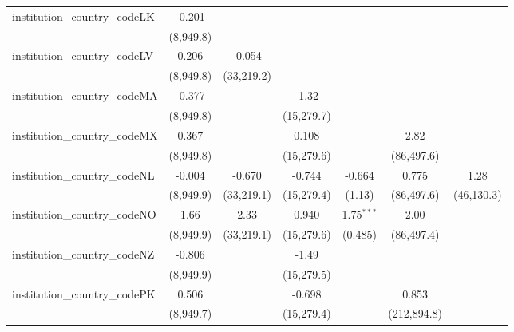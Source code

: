 \begin{tabular}{lcccccc}
   institution\_country\_codeLK          & -0.201        &               &               &               &              &   \\   
                                         & (8,949.8)     &               &               &               &              &   \\   
   institution\_country\_codeLV          & 0.206         & -0.054        &               &               &              &   \\   
                                         & (8,949.8)     & (33,219.2)    &               &               &              &   \\   
   institution\_country\_codeMA          & -0.377        &               & -1.32         &               &              &   \\   
                                         & (8,949.8)     &               & (15,279.7)    &               &              &   \\   
   institution\_country\_codeMX          & 0.367         &               & 0.108         &               & 2.82         &   \\   
                                         & (8,949.8)     &               & (15,279.6)    &               & (86,497.6)   &   \\   
   institution\_country\_codeNL          & -0.004        & -0.670        & -0.744        & -0.664        & 0.775        & 1.28\\   
                                         & (8,949.9)     & (33,219.1)    & (15,279.4)    & (1.13)        & (86,497.6)   & (46,130.3)\\   
   institution\_country\_codeNO          & 1.66          & 2.33          & 0.940         & 1.75$^{***}$  & 2.00         &   \\   
                                         & (8,949.9)     & (33,219.1)    & (15,279.6)    & (0.485)       & (86,497.4)   &   \\   
   institution\_country\_codeNZ          & -0.806        &               & -1.49         &               &              &   \\   
                                         & (8,949.9)     &               & (15,279.5)    &               &              &   \\   
   institution\_country\_codePK          & 0.506         &               & -0.698        &               & 0.853        &   \\   
                                         & (8,949.7)     &               & (15,279.4)    &               & (212,894.8)  &   \\   

\end{tabular}
